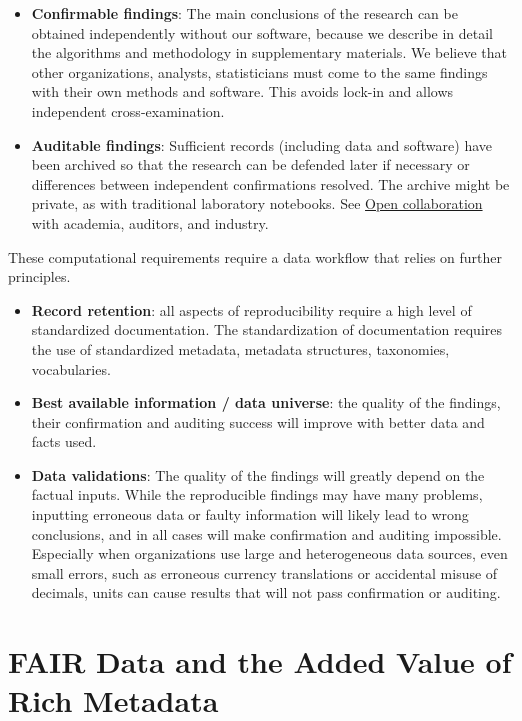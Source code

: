 \documentclass[
  a4paper,
  openany, a4paper, oneside]{book}
\begin{document}
\begin{itemize}
\item
  \textbf{Confirmable findings}: The main conclusions of the research can be obtained independently without our software, because we describe in detail the algorithms and methodology in supplementary materials. We believe that other organizations, analysts, statisticians must come to the same findings with their own methods and software. This avoids lock-in and allows independent cross-examination.
\item
  \textbf{Auditable findings}: Sufficient records (including data and software) have been archived so that the research can be defended later if necessary or differences between independent confirmations resolved. The archive might be private, as with traditional laboratory notebooks. See \protect\hyperlink{opencollaboration}{Open collaboration} with academia, auditors, and industry.
\end{itemize}

These computational requirements require a data workflow that relies on further principles.

\begin{itemize}
\item
  \textbf{Record retention}: all aspects of reproducibility require a high level of standardized documentation. The standardization of documentation requires the use of standardized metadata, metadata structures, taxonomies, vocabularies.
\item
  \textbf{Best available information / data universe}: the quality of the findings, their confirmation and auditing success will improve with better data and facts used.
\item
  \textbf{Data validations}: The quality of the findings will greatly depend on the factual inputs. While the reproducible findings may have many problems, inputting erroneous data or faulty information will likely lead to wrong conclusions, and in all cases will make confirmation and auditing impossible. Especially when organizations use large and heterogeneous data sources, even small errors, such as erroneous currency translations or accidental misuse of decimals, units can cause results that will not pass confirmation or auditing.
\end{itemize}

\hypertarget{FAIR-data}{%
\chapter{FAIR Data and the Added Value of Rich Metadata}\label{FAIR-data}}
\end{document}
